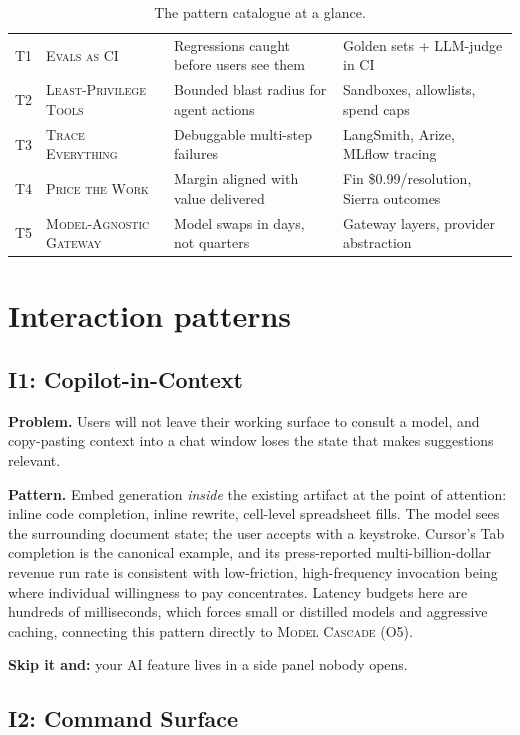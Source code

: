 \documentclass[11pt]{article}
\newcommand{\pat}[1]{\textsc{#1}}
\begin{document}
\begin{table}[tbp]
\begin{tabular}{@{}l L{3.3cm} L{5.4cm} L{4.3cm}@{}}
\midrule
T1 & \pat{Evals as CI} & Regressions caught before users see them & Golden sets + LLM-judge in CI \\
T2 & \pat{Least-Privilege Tools} & Bounded blast radius for agent actions & Sandboxes, allowlists, spend caps \\
T3 & \pat{Trace Everything} & Debuggable multi-step failures & LangSmith, Arize, MLflow tracing \\
T4 & \pat{Price the Work} & Margin aligned with value delivered & Fin \$0.99/resolution, Sierra outcomes \\
T5 & \pat{Model-Agnostic Gateway} & Model swaps in days, not quarters & Gateway layers, provider abstraction \\
\bottomrule
\end{tabular}
\caption{The pattern catalogue at a glance.}
\label{tab:catalogue}
\end{table}

\section{Interaction patterns}
\label{sec:interaction}

\subsection{I1: Copilot-in-Context}

\textbf{Problem.} Users will not leave their working surface to consult a
model, and copy-pasting context into a chat window loses the state that makes
suggestions relevant.

\textbf{Pattern.} Embed generation \emph{inside} the existing artifact at the
point of attention: inline code completion, inline rewrite, cell-level
spreadsheet fills. The model sees the surrounding document state; the user
accepts with a keystroke. Cursor's Tab completion is the canonical example,
and its press-reported multi-billion-dollar revenue run rate
\citep{forbes2026cursor} is consistent with low-friction, high-frequency
invocation being where individual willingness to pay concentrates.
Latency budgets here are hundreds of milliseconds, which forces small or
distilled models and aggressive caching, connecting this pattern directly to
\pat{Model Cascade} (O5).

\textbf{Skip it and:} your AI feature lives in a side panel nobody opens.

\subsection{I2: Command Surface}
\end{document}

